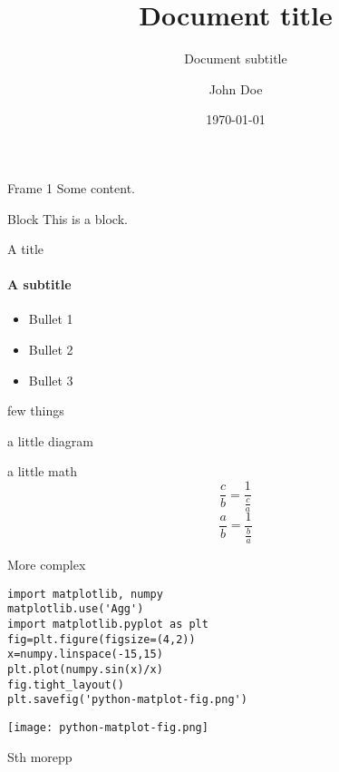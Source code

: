 \documentclass[presentation,11pt]{beamer}
\author{John Doe}
\date{\today}
\title{Document title}
\subtitle{Document subtitle}
\begin{document}
\maketitle

\begin{frame}[label={sec:org996ecfd}]{Frame 1}
Some content.

\begin{block}{Block}
This is a block.
\end{block}
\end{frame}

\begin{frame}[label={sec:orgbe85fab}]{A title}
\framesubtitle{A subtitle}
\begin{itemize}
\item Bullet 1
\item Bullet 2
\item Bullet 3
\end{itemize}
\end{frame}

\begin{frame}[label={sec:orge92b600}]{few things}
\begin{block}{a little diagram}
\usetikzlibrary{shapes,arrows}
\end{block}
\begin{block}{a little math}
$$ \frac{c}{b} = \frac{1}{\frac{c}{a}} $$
$$ \frac{a}{b} = \frac{1}{\frac{b}{a}} $$
\end{block}
\end{frame}

\begin{frame}[fragile,label={sec:org0517989}]{More complex}
 \begin{verbatim}
import matplotlib, numpy
matplotlib.use('Agg')
import matplotlib.pyplot as plt
fig=plt.figure(figsize=(4,2))
x=numpy.linspace(-15,15)
plt.plot(numpy.sin(x)/x)
fig.tight_layout()
plt.savefig('python-matplot-fig.png')
\end{verbatim}

\texttt{[image: python-matplot-fig.png]}
\end{frame}

\begin{frame}[label={sec:org89ba736}]{Sth morepp}
\end{frame}
\end{document}
